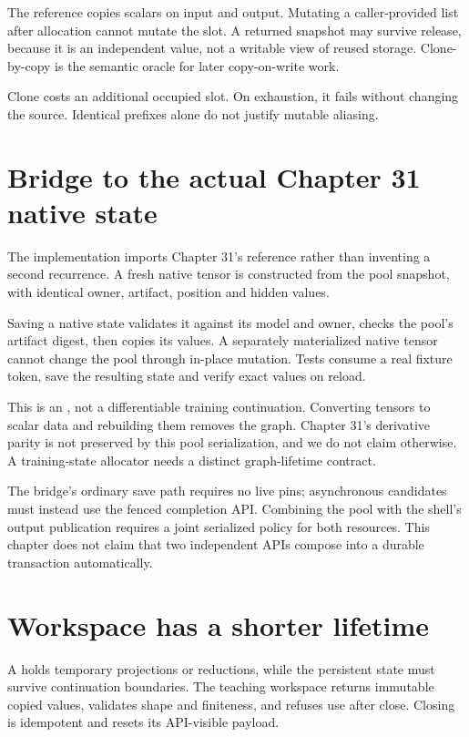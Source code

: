 The reference copies scalars on input and output. Mutating a caller-provided
list after allocation cannot mutate the slot. A returned snapshot may survive
release, because it is an independent value, not a writable view of reused
storage. Clone-by-copy is the semantic oracle for later copy-on-write work.

Clone costs an additional occupied slot. On exhaustion, it fails without
changing the source. Identical prefixes alone do not justify mutable aliasing.

\section{Bridge to the actual Chapter 31 native state}
The implementation imports Chapter 31's reference rather than inventing a
second recurrence. A fresh native tensor is constructed from the pool snapshot,
with identical owner, artifact, position and hidden values.

Saving a native state validates it against its model and owner, checks the
pool's artifact digest, then copies its values. A separately materialized
native tensor cannot change the pool through in-place mutation. Tests consume
a real fixture token, save the resulting state and verify exact values on
reload.

This is an , not a differentiable training continuation.
Converting tensors to scalar data and rebuilding them removes the graph.
Chapter 31's derivative parity is not preserved by this pool serialization,
and we do not claim otherwise. A training-state allocator needs a distinct
graph-lifetime contract.

The bridge's ordinary save path requires no live pins; asynchronous candidates
must instead use the fenced completion API. Combining the pool with the shell's
output publication requires a joint serialized policy for both resources.
This chapter does not claim that two independent APIs compose into a durable
transaction automatically.

\section{Workspace has a shorter lifetime}
A  holds temporary projections or reductions, while the
persistent state must survive continuation boundaries. The teaching workspace
returns immutable copied values, validates shape and finiteness, and refuses
use after close. Closing is idempotent and resets its API-visible payload.

